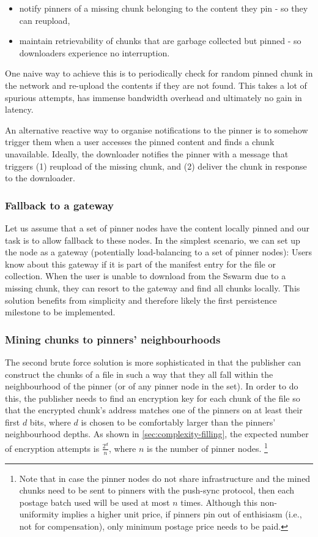 \begin{itemize}
    \item  notify pinners of a missing chunk belonging to the content they pin - so they can reupload,
    \item  maintain retrievability of chunks that are garbage collected but pinned - so downloaders experience no interruption. 
\end{itemize}

One naive way to achieve this is to periodically check for random pinned chunk in the network and re-upload the contents if they are not found. This takes a lot of spurious attempts, has immense bandwidth overhead and ultimately no gain in latency.

An alternative reactive way to organise notifications to the pinner is to somehow trigger them when a user accesses the pinned content and finds a chunk unavailable. Ideally, the downloader notifies the pinner with a message that triggers (1) reupload of the missing chunk, and (2) deliver the chunk in response to the downloader.  

\subsubsection{Fallback to a gateway}

Let us assume that a set of pinner nodes have the content locally pinned and our task is to allow fallback to these nodes. In the simplest scenario, we can set up the node as a gateway (potentially load-balancing to a set of pinner nodes): Users know about this gateway if it is part of the manifest entry for the file or collection. When the user is unable to download from the Sswarm due to a missing chunk, they can resort to the gateway and find all chunks locally.
This solution benefits from simplicity and therefore likely the first persistence milestone to be implemented.  

\subsubsection{Mining chunks to pinners' neighbourhoods}

The second brute force solution is more sophisticated in that the  publisher can construct the chunks of a file in such a way that they all fall within the neighbourhood of the pinner (or of any pinner node in the set). In order to do this, the publisher needs to find an encryption key for each chunk of the file so that the encrypted chunk's address matches one of the pinners on at least their first $d$ bits, where  $d$ is chosen to be comfortably larger than the pinners' neighbourhood depths. As shown in \ref{sec:complexity-filling}, the expected number of encryption attempts is $\frac{2^d}{n}$, where $n$ is the number of pinner nodes.%
%
\footnote{Note that in case the pinner nodes do not share infrastructure and the mined chunks need to be sent to pinners with the push-sync protocol, then each postage batch used will be used at most $n$ times. Although this non-uniformity implies a higher unit price, if pinners pin out  of enthisiasm (i.e., not for compensation), only minimum postage price needs to  be paid.
}

